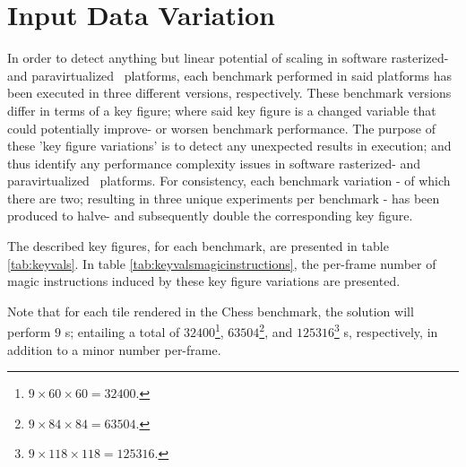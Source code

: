 \section{Input Data Variation}
\label{sec:experimentalmethodology_inputdatavariation}
In order to detect anything but linear potential of scaling in software rasterized- and paravirtualized \dvttermsimics\ platforms, each benchmark performed in said platforms has been executed in three different versions, respectively.
These benchmark versions differ in terms of a key figure; where said key figure is a changed variable that could potentially improve- or worsen benchmark performance.
The purpose of these 'key figure variations' is to detect any unexpected results in execution; and thus identify any performance complexity issues in software rasterized- and paravirtualized \dvttermsimics\ platforms.
For consistency, each benchmark variation - of which there are two; resulting in three unique experiments per benchmark - has been produced to halve- and subsequently double the corresponding key figure.

The described key figures, for each benchmark, are presented in table \ref{tab:keyvals}.
In table \ref{tab:keyvalsmagicinstructions}, the per-frame number of magic instructions induced by these key figure variations are presented.





Note that for each tile rendered in the Chess benchmark, the solution will perform $9$ \dvttermmagicinstruction s; entailing a total of $32400$\footnote{$9\times60\times60=32400$.}, $63504$\footnote{$9\times84\times84=63504$.}, and $125316$\footnote{$9\times118\times118=125316$.} \dvttermmagicinstruction s, respectively, in addition to a minor number per-frame.
